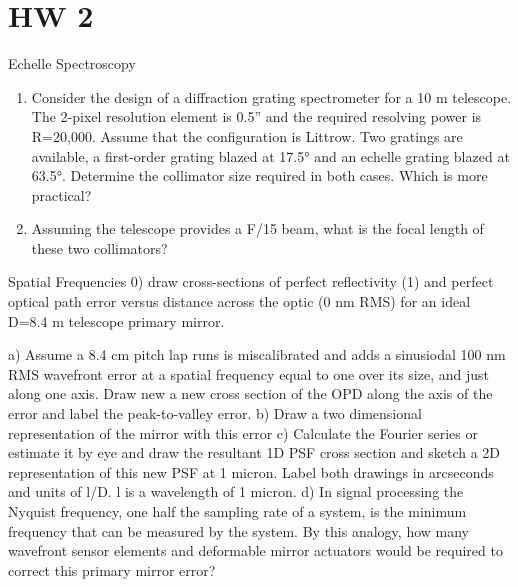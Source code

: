 
\section{HW 2}


\begin{frame}{Echelle Spectroscopy}

 \begin{enumerate}
 \item Consider the design of a diffraction grating spectrometer for a 10 m telescope. The 2-pixel resolution
element is 0.5” and the required resolving power is R=20,000. Assume that the configuration is Littrow.
Two gratings are available, a first-order grating blazed at 17.5° and an echelle grating blazed at 63.5°.
Determine the collimator size required in both cases. Which is more practical?
\item Assuming the telescope
provides a F/15 beam, what is the focal length of these two collimators?
\end{enumerate}
\end{frame}





\begin{frame}{Spatial Frequencies}
0) draw cross-sections of perfect reflectivity  (1) and perfect optical path error versus distance across the optic (0 nm RMS) for an ideal D=8.4 m telescope primary mirror.

a)	Assume a 8.4 cm pitch lap runs is miscalibrated and adds a sinusiodal 100 nm RMS wavefront error at a spatial frequency equal to one over its size, and just along one axis. Draw new a new cross section of the OPD along the axis of the error and label the peak-to-valley error.
b)	Draw a two dimensional representation of the mirror with this error
c)	Calculate the Fourier series or estimate it by eye and draw the resultant 1D PSF cross section and sketch a 2D representation of this new PSF at 1 micron. Label both drawings in arcseconds and units of l/D. l is a wavelength of 1 micron.
d)	In signal processing the Nyquist frequency, one half the sampling rate of a system, is the minimum frequency that can be measured by the system. By this analogy, how many wavefront sensor elements and deformable mirror actuators would be required to correct this primary mirror error?
\end{frame}
\begin{frame}{}
\end{frame}